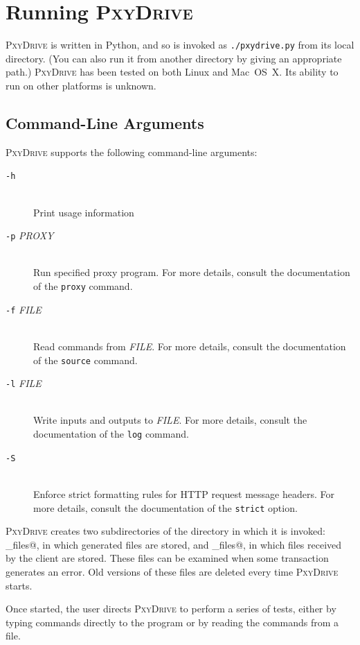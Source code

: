 \documentclass[11pt]{article}
\newcommand{\pxydrive}{\textsc{PxyDrive}}
\begin{document}
\section{Running \pxydrive}
\label{sec:running}

\pxydrive{} is written in Python, and so is invoked as
\texttt{./pxydrive.py} from its local directory.  (You can also run it
from another directory by giving an appropriate path.)  \pxydrive{}
has been tested on both Linux and Mac~OS~X.  Its ability to run on
other platforms is unknown.

\subsection*{Command-Line Arguments}

\pxydrive{} supports the following command-line
arguments:
\begin{description}
\item[\texttt{-h}]  $\;$ \\
Print usage information
\item[\texttt{-p} {\it PROXY}] $\;$ \\
Run specified proxy program.  For
  more details, consult the documentation of the \texttt{proxy}
  command.
\item[\texttt{-f} {\it FILE}]  $\;$ \\
Read commands from {\it FILE}\@.
For more details, consult the documentation of the
  \texttt{source} command.
\item[\texttt{-l} {\it FILE}]  $\;$ \\
Write inputs and outputs to {\it FILE}\@.
For more details, consult the documentation of the
  \texttt{log} command.
\item[\texttt{-S}] $\;$ \\
Enforce strict formatting rules for HTTP request message headers. 
For more details, consult the documentation of the \texttt{strict} option.
\end{description}

\pxydrive{} creates two subdirectories of the directory in which it is
invoked:
\verb@source_files@, in which generated files are stored, and \verb@response_files@,
  in which files received by the client are stored.  These files can
  be examined when some transaction generates an error.
  Old versions of
  these files are deleted every time \pxydrive{} starts.

Once started, the user directs \pxydrive{} to perform a series of
tests, either by typing commands directly to the program or by reading
the commands from a file.
\end{document}
